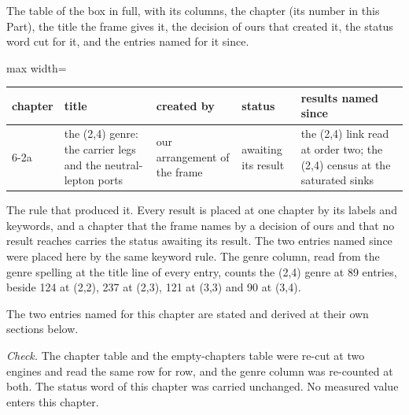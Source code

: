 \begin{chproof}[instrument]
The table of the box in full, with its columns, the chapter (its number in this Part), the title the frame gives it, the decision of ours that created it, the status word cut for it, and the entries named for it since.
\begin{center}\small
\begin{adjustbox}{max width=\linewidth}\begin{tabular}{lllll}
\hline
chapter & title & created by & status & results named since \\
\hline
6-2a & the (2,4) genre: the carrier legs and the neutral-lepton ports & our arrangement of the frame & awaiting its result & the (2,4) link read at order two; the (2,4) census at the saturated sinks \\
\hline
\end{tabular}\end{adjustbox}
\end{center}
The rule that produced it. Every result is placed at one chapter by its labels and keywords, and a chapter that the frame names by a decision of ours and that no result reaches carries the status awaiting its result. The two entries named since were placed here by the same keyword rule. The genre column, read from the genre spelling at the title line of every entry, counts the (2,4) genre at 89 entries, beside 124 at (2,2), 237 at (2,3), 121 at (3,3) and 90 at (3,4).

The two entries named for this chapter are stated and derived at their own sections below.

\emph{Check.} The chapter table and the empty-chapters table were re-cut at two engines and read the same row for row, and the genre column was re-counted at both. The status word of this chapter was carried unchanged.
No measured value enters this chapter.
\end{chproof}
\label{chend:VI-2a-2-4-genre-the-carrier-legs-and-the-neutral-lepton-ports}

